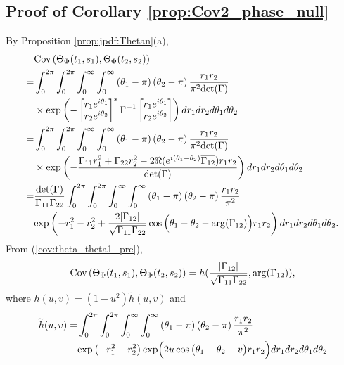 \documentclass{amsart}
\begin{document}
\subsection{Proof of Corollary \ref{prop:Cov2_phase_null}}\label{sec:proof:prop:Cov2_phase_null}
By Proposition \ref{prop:jpdf:Thetan}(a),
\begin{align}\notag
&\textup{Cov}\left(\Theta_{\Phi}(t_{1},s_{1}),\Theta_{\Phi}(t_{2},s_{2})\right)
\\\notag=&\int_{0}^{2\pi}\int_{0}^{2\pi}\int_{0}^{\infty}\int_{0}^{\infty} \left(\theta_{1}-\pi\right)\left(\theta_{2}-\pi\right)\frac{r_{1}r_{2}}{\pi^{2}\textup{det}(\Gamma)}
\\\notag&\times\textup{exp}
\left(-\begin{bmatrix}r_{1}e^{i\theta_{1}} \\ r_{2}e^{i\theta_{2}}\end{bmatrix}^{*}\Gamma^{-1}\begin{bmatrix}r_{1}e^{i\theta_{1}} \\ r_{2}e^{i\theta_{2}}\end{bmatrix}\right)
dr_{1}dr_{2}d\theta_{1}d\theta_{2}
\\\notag=&
\int_{0}^{2\pi}\int_{0}^{2\pi}\int_{0}^{\infty}\int_{0}^{\infty} \left(\theta_{1}-\pi\right)\left(\theta_{2}-\pi\right) \frac{r_{1}r_{2}}{\pi^{2}\textup{det}(\Gamma)}
\\\notag&\times\textup{exp}\left(-\frac{\Gamma_{11}r_{1}^{2}+\Gamma_{22}r_{2}^{2}-2\Re(e^{i(\theta_{1}-\theta_{2})}
\overline{\Gamma_{12}})r_{1}r_{2}}{\textup{det}(\Gamma)}\right)
 dr_{1}dr_{2}d\theta_{1}d\theta_{2}
\\\notag=&
\frac{\textup{det}(\Gamma)}{\Gamma_{11}\Gamma_{22}}\int_{0}^{2\pi}\int_{0}^{2\pi}
\int_{0}^{\infty}\int_{0}^{\infty}\left(\theta_{1}-\pi\right)\left(\theta_{2}-\pi\right) \frac{r_{1}r_{2}}{\pi^{2}}
\\\label{cov:theta_theta1_pre}&\textup{exp}\left(-r_{1}^{2}-r_{2}^{2}+\frac{2|\Gamma_{12}|}{\sqrt{\Gamma_{11}\Gamma_{22}}}
\cos\Big(\theta_{1}-\theta_{2}-\arg(\Gamma_{12})\Big)r_{1}r_{2}
\right)
 dr_{1}dr_{2}d\theta_{1}d\theta_{2}.
\end{align}
From (\ref{cov:theta_theta1_pre}),
\begin{align}\label{cov:theta_theta1}
\textup{Cov}\left(\Theta_{\Phi}(t_{1},s_{1}),\Theta_{\Phi}(t_{2},s_{2})\right)
=h(\frac{|\Gamma_{12}|}{\sqrt{\Gamma_{11}\Gamma_{22}}},\arg(\Gamma_{12})),
\end{align}
where $h(u,v)=\left(1-u^2\right)\widetilde{h}(u,v)$ and
\begin{align}\notag
\widetilde{h}(u,v) =&
\int_{0}^{2\pi}\int_{0}^{2\pi}\int_{0}^{\infty}\int_{0}^{\infty} \left(\theta_{1}-\pi\right)\left(\theta_{2}-\pi\right)\frac{r_{1}r_{2}}{\pi^{2}}
\\\notag&\textup{exp}\left(-r_{1}^{2}-r_{2}^{2}
\right)\textup{exp}\Big(
2u
\cos\big(\theta_{1}-\theta_{2}-v\big)r_{1}r_{2}
\Big)
dr_{1}dr_{2}d\theta_{1}d\theta_{2}
\end{align}
\end{document}
